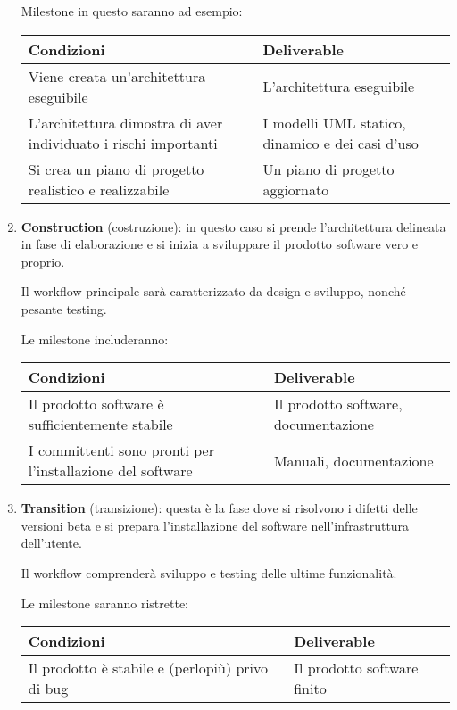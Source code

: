 \documentclass[a4paper,11pt]{article}
\begin{document}
\begin{enumerate}
	Milestone in questo saranno ad esempio:
	\begin{table}[H]
	\center {}
	\begin{tabular} { p{7cm} | p{7cm} }
		\bfseries Condizioni & \bfseries Deliverable \\
		\hline
		Viene creata un'architettura eseguibile & L'architettura eseguibile \\ 
		L'architettura dimostra di aver individuato i rischi importanti & I modelli UML statico, dinamico e dei casi d'uso \\
		Si crea un piano di progetto realistico e realizzabile & Un piano di progetto aggiornato \\
	\end{tabular}
\end{table}

	\item \textbf{Construction} (costruzione): in questo caso si prende l'architettura delineata in fase di elaborazione e si inizia a sviluppare il prodotto software vero e proprio.

	Il workflow principale sarà caratterizzato da design e sviluppo, nonché pesante testing.
		
	Le milestone includeranno:
	\begin{table}[H]
	\center {}
	\begin{tabular} { p{7cm} | p{7cm} }
		\bfseries Condizioni & \bfseries Deliverable \\
		\hline
		Il prodotto software è sufficientemente stabile & Il prodotto software, documentazione \\
		I committenti sono pronti per l'installazione del software & Manuali, documentazione
	\end{tabular}
\end{table}

	\item \textbf{Transition} (transizione): questa è la fase dove si risolvono i difetti delle versioni beta e si prepara l'installazione del software nell'infrastruttura dell'utente.

		Il workflow comprenderà sviluppo e testing delle ultime funzionalità.

	Le milestone saranno ristrette: 
	\begin{table}[H]
	\center {}
	\begin{tabular} { p{7cm} | p{7cm} }
		\bfseries Condizioni & \bfseries Deliverable \\
		\hline
		Il prodotto è stabile e (perlopiù) privo di bug & Il prodotto software finito
	\end{tabular}
\end{table}

\end{enumerate}
\end{document}

